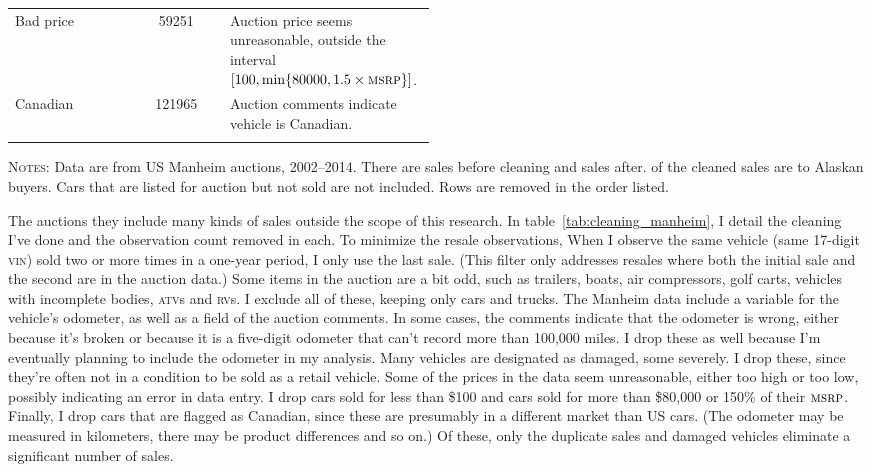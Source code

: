 \documentclass[11pt,letterpaper,oneside]{article}
\newcommand{\vin}{\textsc{vin}}
\newcommand{\snippet}[1]{\hspace{-0.15em}}
\begin{document}
\begin{doublespacing}
\begin{table}[!hbtp]
\begin{tabular}{l S p{0.493\linewidth}}
	\addlinespace

    Bad price &
    59251
    & Auction price seems unreasonable, outside the interval $[100, \min\{80000, 1.5\times \textsc{msrp} \}]$.\\

	\addlinespace

    Canadian &
    121965
    & Auction comments indicate vehicle is Canadian.\\

    \bottomrule
    \addlinespace
\end{tabular}
\footnotesize
\textsc{Notes:} Data are from US Manheim auctions, 2002--2014.
There are \snippet{auctions_uncleaned_total_obs_count.tex} sales before cleaning and \snippet{auctions_cleaned_total_obs_count.tex} sales after.
\snippet{auctions_cleaned_alaska_obs_count.tex} of the cleaned sales are to Alaskan buyers.
Cars that are listed for auction but not sold are not included.
Rows are removed in the order listed.
\end{table}

The auctions they include many kinds of sales outside the scope of this research.
In table~\ref{tab:cleaning_manheim}, I detail the cleaning I've done and the observation count removed in each.
To minimize the resale observations, When I observe the same vehicle (same 17-digit \vin{}) sold two or more times in a one-year period, I only use the last sale.
(This filter only addresses resales where both the initial sale and the second are in the auction data.)
Some items in the auction are a bit odd, such as trailers, boats, air compressors, golf carts, vehicles with incomplete bodies, \textsc{atv}s and \textsc{rv}s.
I exclude all of these, keeping only cars and trucks.
The Manheim data include a variable for the vehicle's odometer, as well as a field of the auction comments.
In some cases, the comments indicate that the odometer is wrong, either because it's broken or because it is a five\hyp{}digit odometer that can't record more than 100,000 miles.
I drop these as well because I'm eventually planning to include the odometer in my analysis.
Many vehicles are designated as damaged, some severely.  I drop these, since they're often not in a condition to be sold as a retail vehicle.
Some of the prices in the data seem unreasonable, either too high or too low, possibly indicating an error in data entry.
I drop cars sold for less than \$100 and cars sold for more than \$80,000 or 150\% of their $\textsc{msrp}$.
Finally, I drop cars that are flagged as Canadian, since these are presumably in a different market than US cars.
(The odometer may be measured in kilometers, there may be product differences and so on.)
Of these, only the duplicate sales and damaged vehicles eliminate a significant number of sales.



\end{doublespacing}
\end{document}
